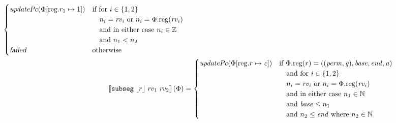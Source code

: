 \documentclass[a4paper]{article}
\newcommand{\update}[2]{[#1 \mapsto #2]}
\newcommand{\sem}[1]{\left\llbracket #1 \right\rrbracket}
\newcommand{\var}[1]{\mathit{#1}}
\newcommand{\rv}{\var{rv}}
\newcommand{\gl}{\var{g}}
\newcommand{\addr}{\var{a}}
\newcommand{\start}{\var{base}}
\newcommand{\addrend}{\var{end}}
\newcommand{\perm}{\var{perm}}
\newcommand{\stdcap}[1][(\perm,\gl)]{\left(#1,\start,\addrend,\addr \right)}
\newcommand{\plainproj}[1]{\mathrm{#1}}
\newcommand{\memreg}[1][\Phi]{#1.\plainproj{reg}}
\newcommand{\updateReg}[3][\Phi]{#1\update{\plainproj{reg}.#2}{#3}}
\newcommand{\failed}{\textsl{failed}}
\newcommand{\plainfun}[2]{
  \ifthenelse{\equal{#2}{}}
  {\mathit{#1}}
  {\mathit{#1}(#2)}
}
\newcommand{\stdUpdatePc}[1]{\plainfun{updatePc}{#1}}
\newcommand{\nats}{\mathbb{N}}
\newcommand{\ints}{\mathbb{Z}}
\newcommand{\refreg}[1]{\lfloor #1 \rfloor}
\newcommand{\zinstr}[1]{\mathtt{#1}}
\newcommand{\threeinstr}[4]{\zinstr{#1} \; #2 \; #3 \; #4}
\newcommand{\subseg}[3]{\threeinstr{subseg}{#1}{#2}{#3}}
\begin{document}
\begin{align*}
                                                          \begin{cases}
                                                            \stdUpdatePc{\updateReg{r_1}{1}} &
                                                            \arraycolsep=0pt
                                                            \begin{array}[t]{l}
                                                              \text{if for $i \in \{1,2\}$}\\
                                                              \quad\text{$n_i = \rv_i$ or $n_i = \memreg(\rv_i)$}\\
                                                              \quad\text{and in either case $n_i \in \ints$}\\
                                                              \quad\text{and $n_1 < n_2$}\\                                                              
                                                            \end{array}\\
                                                            \failed & \text{otherwise}
                                                          \end{cases}
\\
  \sem{\subseg{\refreg{r}}{\rv_1}{\rv_2}}(\Phi) & = 
                                            \begin{cases}
                                              \stdUpdatePc{\updateReg{r}{\var{c}}} &
                                              \arraycolsep=0pt
                                              \begin{array}[t]{l}
                                                \text{if $\memreg(r) = \stdcap$} \\
                                                \quad\text{and for $i \in \{1,2\}$}\\
                                                \quad\text{$n_i = \rv_i$ or $n_i = \memreg(\rv_i)$}\\
                                                \quad\text{and in either case $n_1 \in \nats$}\\
                                                \quad\text{and $\start \leq n_1$}\\
                                                \quad\text{and $n_2 \leq \addrend$ where $n_2 \in \nats$}\\

\end{array}
\end{cases}
\end{align*}
\end{document}
